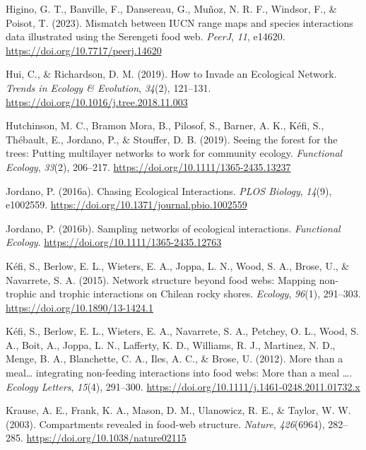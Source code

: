 \documentclass[
]{article}
\newlength{\cslhangindent}
\newenvironment{CSLReferences}[2] %
 {\begin{list}{}{%
  \setlength{\itemindent}{0pt}
  \setlength{\leftmargin}{0pt}
  \setlength{\parsep}{0pt}
  \ifodd #1
   \setlength{\leftmargin}{\cslhangindent}
   \setlength{\itemindent}{-1\cslhangindent}
  \fi
  \setlength{\itemsep}{#2\baselineskip}}}
 {\end{list}}
\begin{document}
\begin{CSLReferences}{1}{0}
Higino, G. T., Banville, F., Dansereau, G., Muñoz, N. R. F., Windsor,
F., \& Poisot, T. (2023). Mismatch between {IUCN} range maps and species
interactions data illustrated using the {Serengeti} food web.
\emph{PeerJ}, \emph{11}, e14620.
\url{https://doi.org/10.7717/peerj.14620}

Hui, C., \& Richardson, D. M. (2019). How to {Invade} an {Ecological
Network}. \emph{Trends in Ecology \& Evolution}, \emph{34}(2), 121--131.
\url{https://doi.org/10.1016/j.tree.2018.11.003}

Hutchinson, M. C., Bramon Mora, B., Pilosof, S., Barner, A. K., Kéfi,
S., Thébault, E., Jordano, P., \& Stouffer, D. B. (2019). Seeing the
forest for the trees: {Putting} multilayer networks to work for
community ecology. \emph{Functional Ecology}, \emph{33}(2), 206--217.
\url{https://doi.org/10.1111/1365-2435.13237}

Jordano, P. (2016a). Chasing {Ecological Interactions}. \emph{PLOS
Biology}, \emph{14}(9), e1002559.
\url{https://doi.org/10.1371/journal.pbio.1002559}

Jordano, P. (2016b). Sampling networks of ecological interactions.
\emph{Functional Ecology}. \url{https://doi.org/10.1111/1365-2435.12763}

Kéfi, S., Berlow, E. L., Wieters, E. A., Joppa, L. N., Wood, S. A.,
Brose, U., \& Navarrete, S. A. (2015). Network structure beyond food
webs: Mapping non-trophic and trophic interactions on {Chilean} rocky
shores. \emph{Ecology}, \emph{96}(1), 291--303.
\url{https://doi.org/10.1890/13-1424.1}

Kéfi, S., Berlow, E. L., Wieters, E. A., Navarrete, S. A., Petchey, O.
L., Wood, S. A., Boit, A., Joppa, L. N., Lafferty, K. D., Williams, R.
J., Martinez, N. D., Menge, B. A., Blanchette, C. A., Iles, A. C., \&
Brose, U. (2012). More than a meal{\ldots{}} integrating non-feeding
interactions into food webs: {More} than a meal {\ldots{}}.
\emph{Ecology Letters}, \emph{15}(4), 291--300.
\url{https://doi.org/10.1111/j.1461-0248.2011.01732.x}

Krause, A. E., Frank, K. A., Mason, D. M., Ulanowicz, R. E., \& Taylor,
W. W. (2003). Compartments revealed in food-web structure.
\emph{Nature}, \emph{426}(6964), 282--285.
\url{https://doi.org/10.1038/nature02115}


\end{CSLReferences}
\end{document}
